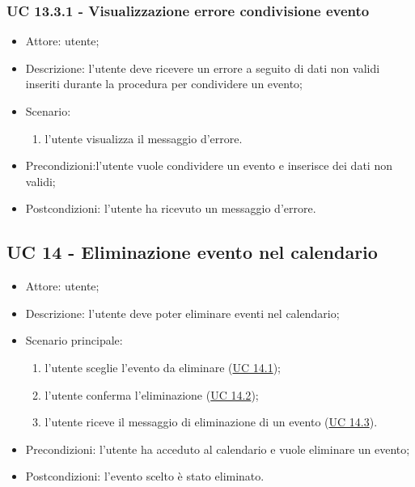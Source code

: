 \subsubsection{UC 13.3.1 - Visualizzazione errore condivisione evento} \label{sec: UC 13.3.1}
\begin{itemize}
    \item Attore: utente;
    \item Descrizione: l'utente deve ricevere un errore a seguito di dati non validi inseriti durante la procedura per condividere un evento;
    \item Scenario:
        \begin{enumerate}
        \item l'utente visualizza il messaggio d'errore.
        \end{enumerate}
    
    \item Precondizioni:l'utente vuole condividere un evento e inserisce dei dati non validi;
    \item Postcondizioni: l'utente ha ricevuto un messaggio d'errore.
\end{itemize}


\subsection{UC 14 - Eliminazione evento nel calendario}
\begin{itemize}
    \item Attore: utente;
    \item Descrizione: l'utente deve poter eliminare eventi nel calendario;
    \item Scenario principale:
        \begin{enumerate}
        \item l'utente sceglie l'evento da eliminare (\hyperref[sec: UC 14.1]{UC 14.1});
        \item l'utente conferma l'eliminazione (\hyperref[sec: UC 14.2]{UC 14.2});
        \item l'utente riceve il messaggio di eliminazione di un evento (\hyperref[sec: UC 14.3]{UC 14.3}).
        \end{enumerate}
    \item Precondizioni: l'utente ha acceduto al calendario e vuole eliminare un evento;
    \item Postcondizioni: l'evento scelto è stato eliminato.
\end{itemize}

